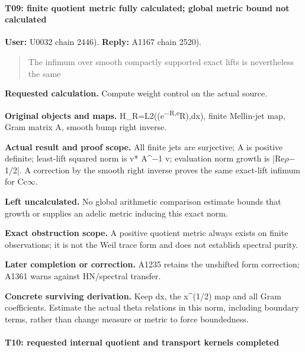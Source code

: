 \paragraph{T09: finite quotient metric fully calculated; global metric
bound not
calculated}\label{t09-finite-quotient-metric-fully-calculated-global-metric-bound-not-calculated}

\textbf{User:} U0032
\protect{} chain 2446).
\textbf{Reply:} A1167
\protect{} chain 2520).

\begin{quote}
The infimum over smooth compactly supported exact lifts is nevertheless
the same
\end{quote}

\textbf{Requested calculation.} Compute weight control on the actual
source.

\textbf{Original objects and maps.}
H\_R=L2((e\textsuperscript{\allowbreak{}\ensuremath{−}\allowbreak{}R,e}R),dx),
finite Mellin-jet map, Gram matrix A, smooth bump right inverse.

\textbf{Actual result and proof scope.} All finite jets are surjective;
A is positive definite; least-lift squared norm is v*
A\textasciicircum{}\allowbreak{}\ensuremath{−}\allowbreak{}1 v;
evaluation norm growth is
|Re\allowbreak{}\ensuremath{ρ}\allowbreak{}\allowbreak{}\ensuremath{−}\allowbreak{}1/2|.
A correction by the smooth right inverse proves the same exact-lift
infimum for Cc\allowbreak{}\ensuremath{∞}\allowbreak{}.

\textbf{Left uncalculated.} No global arithmetic comparison estimate
bounds that growth or supplies an adelic metric inducing this exact
norm.

\textbf{Exact obstruction scope.} A positive quotient metric always
exists on finite observations; it is not the Weil trace form and does
not establish spectral purity.

\textbf{Later completion or correction.} A1235 retains the unshifted
form correction; A1361 warns against HN/spectral transfer.

\textbf{Concrete surviving derivation.} Keep dx, the x\^{}(1/2) map and
all Gram coefficients. Estimate the actual theta relations in this norm,
including boundary terms, rather than change measure or metric to force
boundedness.

\paragraph{T10: requested internal quotient and transport kernels
completed}\label{t10-requested-internal-quotient-and-transport-kernels-completed}

